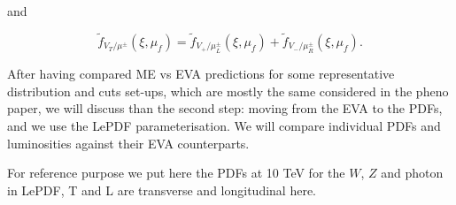 \documentclass[a4paper,11pt]{article}
\begin{document}
and 

\begin{equation}
 \tilde{f}_{V_T/\mu^\pm}(\xi,\mu_f) =
\tilde{f}_{V_+/\mu^\pm_L}(\xi,\mu_f) + \tilde{f}_{V_-/\mu^\pm_R}(\xi,\mu_f).
\label{eq:pdfDef_unpolarizedMuon}
\end{equation}



\begin{table}[!t]
\begin{center}
\caption{
EW chiral couplings and coupling strength normalizations used in the EVA for fermions $f,f'$ with weak isospin charge $(T_3^f)_L=\pm1/2$ and electric charge $Q^f$, with normalization $Q^\ell=-1$.
}
\label{tab:ewa_coup}
\end{center}
\end{table}



After having compared ME vs EVA predictions for some representative distribution and cuts set-ups, which are mostly the same considered in the pheno paper, we will discuss than the second step: moving from the EVA to the PDFs, and we use the {\small \sc LePDF} parameterisation.
We will compare individual PDFs and luminosities against their EVA counterparts.

For reference purpose we put here the PDFs at 10 TeV for the $W$, $Z$ and photon in {\small \sc LePDF}, T and L are transverse and longitudinal here.
\end{document}
